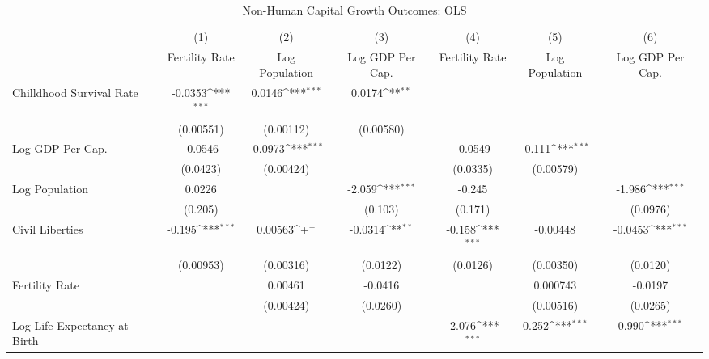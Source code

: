 \begin{table}[htbp]\centering
\def\sym#1{\ifmmode^{#1}\else\(^{#1}\)\fi}
\caption{Non-Human Capital Growth Outcomes: OLS}
\begin{tabular}{l*{6}{c}}
\toprule
                &\multicolumn{1}{c}{(1)}&\multicolumn{1}{c}{(2)}&\multicolumn{1}{c}{(3)}&\multicolumn{1}{c}{(4)}&\multicolumn{1}{c}{(5)}&\multicolumn{1}{c}{(6)}\\
                &\multicolumn{1}{c}{Fertility Rate}&\multicolumn{1}{c}{Log Population}&\multicolumn{1}{c}{Log GDP Per Cap.}&\multicolumn{1}{c}{Fertility Rate}&\multicolumn{1}{c}{Log Population}&\multicolumn{1}{c}{Log GDP Per Cap.}\\
\midrule
Chilldhood Survival Rate&  -0.0353\sym{***}&   0.0146\sym{***}&   0.0174\sym{**} &                  &                  &                  \\
                &(0.00551)         &(0.00112)         &(0.00580)         &                  &                  &                  \\
\addlinespace
Log GDP Per Cap.&  -0.0546         &  -0.0973\sym{***}&                  &  -0.0549         &   -0.111\sym{***}&                  \\
                & (0.0423)         &(0.00424)         &                  & (0.0335)         &(0.00579)         &                  \\
\addlinespace
Log Population  &   0.0226         &                  &   -2.059\sym{***}&   -0.245         &                  &   -1.986\sym{***}\\
                &  (0.205)         &                  &  (0.103)         &  (0.171)         &                  & (0.0976)         \\
\addlinespace
Civil Liberties &   -0.195\sym{***}&  0.00563\sym{+}  &  -0.0314\sym{**} &   -0.158\sym{***}& -0.00448         &  -0.0453\sym{***}\\
                &(0.00953)         &(0.00316)         & (0.0122)         & (0.0126)         &(0.00350)         & (0.0120)         \\
\addlinespace
Fertility Rate  &                  &  0.00461         &  -0.0416         &                  & 0.000743         &  -0.0197         \\
                &                  &(0.00424)         & (0.0260)         &                  &(0.00516)         & (0.0265)         \\
\addlinespace
Log Life Expectancy at Birth&                  &                  &                  &   -2.076\sym{***}&    0.252\sym{***}&    0.990\sym{***}\\

\end{tabular}
\end{table}
